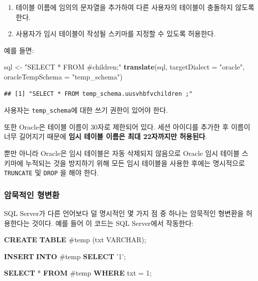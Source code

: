 \documentclass[11pt]{book}
\newenvironment{Shaded}{\begin{snugshade}}{\end{snugshade}}
\newcommand{\KeywordTok}[1]{\textcolor[rgb]{0.13,0.29,0.53}{\textbf{#1}}}
\newcommand{\DataTypeTok}[1]{\textcolor[rgb]{0.13,0.29,0.53}{#1}}
\newcommand{\DecValTok}[1]{\textcolor[rgb]{0.00,0.00,0.81}{#1}}
\newcommand{\StringTok}[1]{\textcolor[rgb]{0.31,0.60,0.02}{#1}}
\newcommand{\NormalTok}[1]{#1}
\providecommand{\tightlist}{%
  \setlength{\itemsep}{0pt}\setlength{\parskip}{0pt}}
\theoremstyle{definition}
\theoremstyle{definition}
\theoremstyle{definition}
\theoremstyle{remark}
\begin{document}
\begin{enumerate}
\def\labelenumi{\arabic{enumi}.}
\tightlist
\item
  테이블 이름에 임의의 문자열을 추가하여 다른 사용자의 테이블이 충돌하지
  않도록 한다.
\item
  사용자가 임시 테이블이 작성될 스키마를 지정할 수 있도록 허용한다.
\end{enumerate}

예를 들면:

\begin{Shaded}
\begin{Highlighting}[]
\NormalTok{sql <-}\StringTok{ "SELECT * FROM #children;"}
\KeywordTok{translate}\NormalTok{(sql, }\DataTypeTok{targetDialect =} \StringTok{"oracle"}\NormalTok{, }\DataTypeTok{oracleTempSchema =} \StringTok{"temp_schema"}\NormalTok{)}
\end{Highlighting}
\end{Shaded}

\begin{verbatim}
## [1] "SELECT * FROM temp_schema.uusvhbfvchildren ;"
\end{verbatim}

사용자는 \texttt{temp\_schema}에 대한 쓰기 권한이 있어야 한다.

또한 Oracle은 테이블 이름이 30자로 제한되어 있다. 세션 아이디를 추가한
후 이름이 너무 길어지기 때문에 \textbf{임시 테이블 이름은 최대
22자까지만 허용된다}.

뿐만 아니라 Oracle은 임시 테이블은 자동 삭제되지 않음으로 Oracle 임시
테이블 스키마에 누적되는 것을 방지하기 위해 모든 임시 테이블을 사용한
후에는 명시적으로 \texttt{TRUNCATE} 및 \texttt{DROP} 을 해야 한다.

\subsubsection*{암묵적인 형변환}\label{-}

SQL Server가 다른 언어보다 덜 명시적인 몇 가지 점 중 하나는 암묵적인
형변환을 허용한다는 것이다. 예를 들어 이 코드는 SQL Server에서 작동한다:

\begin{Shaded}
\begin{Highlighting}[]
\KeywordTok{CREATE} \KeywordTok{TABLE}\NormalTok{ #temp (txt }\DataTypeTok{VARCHAR}\NormalTok{);}

\KeywordTok{INSERT} \KeywordTok{INTO}\NormalTok{ #temp}
\KeywordTok{SELECT} \StringTok{'1'}\NormalTok{;}

\KeywordTok{SELECT}\NormalTok{ * }\KeywordTok{FROM}\NormalTok{ #temp }\KeywordTok{WHERE}\NormalTok{ txt = }\DecValTok{1}\NormalTok{;}
\end{Highlighting}
\end{Shaded}
\end{document}
